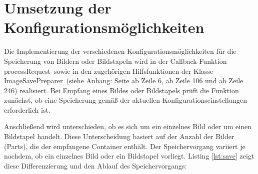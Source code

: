 \section{Umsetzung der Konfigurationsmöglichkeiten}

Die Implementierung der verschiedenen Konfigurationsmöglichkeiten für die Speicherung von Bildern oder Bildstapeln wird in der Callback-Funktion \glqq processRequest\grqq\
sowie in den zugehörigen Hilfsfunktionen der Klasse \glqq ImageSavePreparer\grqq\ (siehe Anhang: Seite \pageref{processRequest} ab Zeile 6, \pageref{ImageSavePreparer1} ab Zeile 106 und \pageref{ImageSavePreparer2} ab Zeile 246) realisiert. Bei Empfang eines Bildes oder Bildstapels prüft die Funktion zunächst, ob eine 
Speicherung gemäß der aktuellen Konfigurationseinstellungen erforderlich ist.

Anschließend wird unterschieden, ob es sich um ein einzelnes Bild oder um einen Bildstapel handelt. Diese Unterscheidung basiert auf der Anzahl der Bilder (Parts), die der 
empfangene Container enthält. Der Speichervorgang variiert je nachdem, ob ein einzelnes Bild oder ein Bildstapel vorliegt. Listing \ref{lst:save} zeigt diese Differenzierung 
und den Ablauf des Speichervorgangs:

\vspace{12pt}

